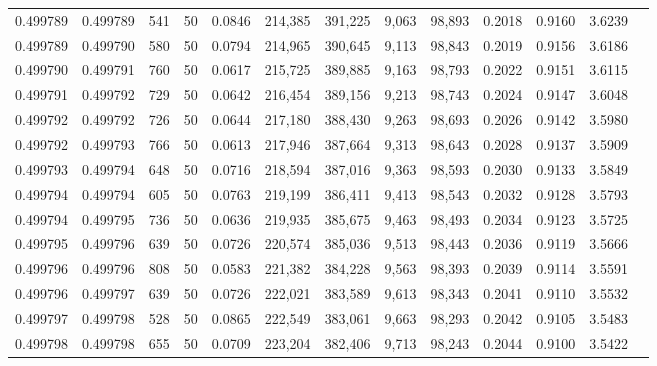 \begin{tabular}{rrrrrrrrrrrrr}
0.499789 & 0.499789 &   541 &  50 &                                     0.0846 & 214,385 & 391,225 &   9,063 &  98,893 & 0.2018 & 0.9160 & 3.6239 \\
0.499789 & 0.499790 &   580 &  50 &                                     0.0794 & 214,965 & 390,645 &   9,113 &  98,843 & 0.2019 & 0.9156 & 3.6186 \\
0.499790 & 0.499791 &   760 &  50 &                                     0.0617 & 215,725 & 389,885 &   9,163 &  98,793 & 0.2022 & 0.9151 & 3.6115 \\
0.499791 & 0.499792 &   729 &  50 &                                     0.0642 & 216,454 & 389,156 &   9,213 &  98,743 & 0.2024 & 0.9147 & 3.6048 \\
0.499792 & 0.499792 &   726 &  50 &                                     0.0644 & 217,180 & 388,430 &   9,263 &  98,693 & 0.2026 & 0.9142 & 3.5980 \\
0.499792 & 0.499793 &   766 &  50 &                                     0.0613 & 217,946 & 387,664 &   9,313 &  98,643 & 0.2028 & 0.9137 & 3.5909 \\
0.499793 & 0.499794 &   648 &  50 &                                     0.0716 & 218,594 & 387,016 &   9,363 &  98,593 & 0.2030 & 0.9133 & 3.5849 \\
0.499794 & 0.499794 &   605 &  50 &                                     0.0763 & 219,199 & 386,411 &   9,413 &  98,543 & 0.2032 & 0.9128 & 3.5793 \\
0.499794 & 0.499795 &   736 &  50 &                                     0.0636 & 219,935 & 385,675 &   9,463 &  98,493 & 0.2034 & 0.9123 & 3.5725 \\
0.499795 & 0.499796 &   639 &  50 &                                     0.0726 & 220,574 & 385,036 &   9,513 &  98,443 & 0.2036 & 0.9119 & 3.5666 \\
0.499796 & 0.499796 &   808 &  50 &                                     0.0583 & 221,382 & 384,228 &   9,563 &  98,393 & 0.2039 & 0.9114 & 3.5591 \\
0.499796 & 0.499797 &   639 &  50 &                                     0.0726 & 222,021 & 383,589 &   9,613 &  98,343 & 0.2041 & 0.9110 & 3.5532 \\
0.499797 & 0.499798 &   528 &  50 &                                     0.0865 & 222,549 & 383,061 &   9,663 &  98,293 & 0.2042 & 0.9105 & 3.5483 \\
0.499798 & 0.499798 &   655 &  50 &                                     0.0709 & 223,204 & 382,406 &   9,713 &  98,243 & 0.2044 & 0.9100 & 3.5422 \\

\end{tabular}
